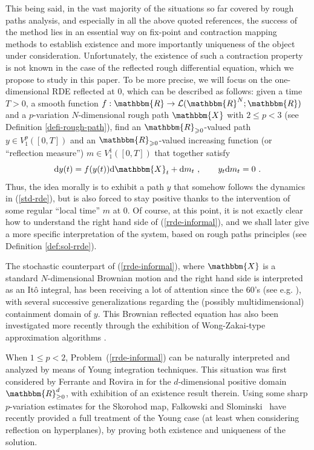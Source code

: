 \documentclass[11pt,reqno,oneside]{amsart}
\numberwithin{equation}{section}
\newcommand{\mathd}{\mathrm{d}}
\begin{document}
\smallskip

This being said, in the vast majority of the situations so far covered by rough paths analysis, and especially in all the above quoted references, the success of the method lies in an essential way on fix-point and contraction mapping methods to establish existence and more importantly uniqueness of the object under consideration. 
Unfortunately, the existence of such a contraction property is not known in the case of the reflected rough differential equation, which we propose to study in this paper. To be more precise, we will focus on the one-dimensional RDE reflected at $0$, which can be described as follows: given a time $T > 0$, a smooth function $f :\mathbbm{R} \to \mathcal{L} (\mathbbm{R}^N ;\mathbbm{R})$ and a $p$-variation $N$-dimensional rough path $\mathbbm{X}$ with $2\leqslant p<3$ (see Definition \ref{defi-rough-path}), find an $\mathbbm{R}_{\geqslant 0}$-valued path $y\in V^p_1 ([0, T])$ and an $\mathbbm{R}_{\geqslant 0}$-valued increasing function (or \enquote{reflection measure}) $m\in  V^1_1 ([0, T])$ that together satisfy
\begin{equation}\label{rrde-informal}
\mathd y (t) = f (y (t)) \mathd \mathbbm{X}_t + \mathd m_t \ , \qquad y_t \mathd m_t=0 \ .
\end{equation}
Thus, the idea morally is to exhibit a path $y$ that somehow follows the dynamics in (\ref{std-rde}), but is also forced to stay positive thanks to the intervention of some regular \enquote{local time} $m$ at $0$. Of course, at this point, it is not exactly clear how to understand the right hand side of (\ref{rrde-informal}), and we shall later give a more specific interpretation of the system, based on rough paths principles (see Definition \ref{def:sol-rrde}).

\smallskip

The stochastic counterpart of (\ref{rrde-informal}), where $\mathbbm{X}$ is a standard $N$-dimensional Brownian motion and the right hand side is interpreted as an It{\^o} integral, has been receiving a lot of attention since the 60's (see e.g. \cite{lions-snitzman,saisho,skorohod,tanaka}), with several successive generalizations regarding the (possibly multidimensional) containment domain of $y$. This Brownian reflected equation has also been investigated more recently through the exhibition of Wong-Zakai-type approximation algorithms \cite{aida-sasaki}.

\smallskip

{When $1\leqslant p<2$, Problem~(\ref{rrde-informal}) can be naturally interpreted and analyzed by means of Young integration techniques. This situation was first considered by Ferrante and Rovira in \cite{rovira} for the $d$-dimensional positive domain $\mathbbm{R}_{\geq 0}^d$, with exhibition of an existence result therein. Using some sharp $p$-variation estimates for the Skorohod map, Falkowski and Slominski~\cite{falkowski-slominski, FS15} have recently provided a full treatment of the Young case (at least when considering reflection on hyperplanes), by proving both existence and uniqueness of the solution.}  
\end{document}
